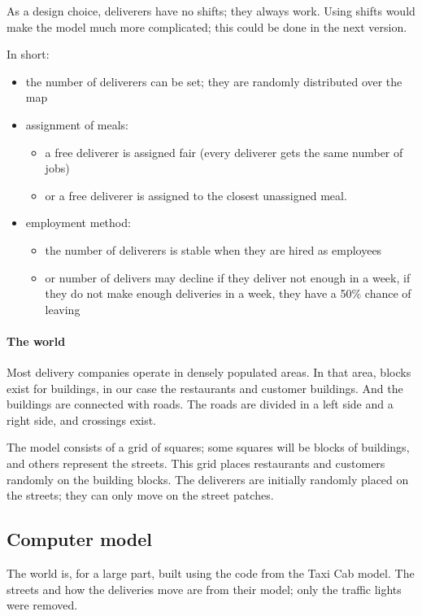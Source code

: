 As a design choice, deliverers have no shifts; they always work.
Using shifts would make the model much more complicated; this could be done in the next version.

In short:

\begin{itemize}
\item the number of deliverers can be set; they are randomly distributed over the map
\item assignment of meals:
\begin{itemize}
      \item a free deliverer is assigned fair (every deliverer gets the same number of jobs)
      \item or a free deliverer is assigned to the closest unassigned meal.
\end{itemize}
\item employment method:
\begin{itemize}
      \item the number of deliverers is stable when they are hired as employees
      \item or number of delivers may decline if they deliver not enough in a week,
    if they do not make enough deliveries in a week, they have a 50\% chance of leaving
\end{itemize}
\end{itemize}

\paragraph{The world}
Most delivery companies operate in densely populated areas.
In that area, blocks exist for buildings, in our case the restaurants and customer buildings.
And the buildings are connected with roads.
The roads are divided in a left side and a right side, and crossings exist.

The model consists of a grid of squares; some squares will be blocks of buildings, and others represent the streets.
This grid places restaurants and customers randomly on the building blocks.
The deliverers are initially randomly placed on the streets; they can only move on the street patches.

\subsection{Computer model}\label{subsec:computer-model}
The world is, for a large part, built using the code from the Taxi Cab model.
The streets and how the deliveries move are from their model; only the traffic lights were removed.

